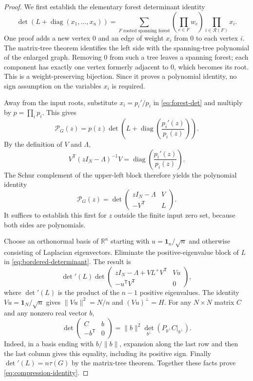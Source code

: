 \begin{proof}
We first establish the elementary forest determinant identity
\begin{equation}\label{eq:forest-det}
 \det(L+\operatorname{diag}(x_1,\ldots,x_n))
 =\sum_{F\text{ rooted spanning forest}}
   \left(\prod_{e\in F}w_e\right)\prod_{i\in\mathcal R(F)}x_i.
\end{equation}
One proof adds a new vertex $0$ and an edge of weight $x_i$ from $0$ to
each vertex $i$.  The matrix-tree theorem identifies the left side with
the spanning-tree polynomial of the enlarged graph.  Removing $0$ from
such a tree leaves a spanning forest; each component has exactly one
vertex formerly adjacent to $0$, which becomes its root.  This is a
weight-preserving bijection.  Since it proves a polynomial identity, no
sign assumption on the variables $x_i$ is required.

Away from the input roots, substitute $x_i=p_i'/p_i$ in
\eqref{eq:forest-det} and multiply by $p=\prod_i p_i$.  This gives
\begin{equation}\label{eq:meromorphic-determinant}
 \mathcal P_G(z)=p(z)
 \det\left(L+\operatorname{diag}\left(\frac{p_i'(z)}{p_i(z)}\right)\right).
\end{equation}
By the definition of $V$ and $\Lambda$,
\[
 V^{\mathsf T}(zI_N-\Lambda)^{-1}V
  =\operatorname{diag}\left(\frac{p_i'(z)}{p_i(z)}\right).
\]
The Schur complement of the upper-left block therefore yields the
polynomial identity
\begin{equation}\label{eq:bordered-determinant}
 \mathcal P_G(z)=
 \det\begin{pmatrix}zI_N-\Lambda&V\\-V^{\mathsf T}&L\end{pmatrix}.
\end{equation}
It suffices to establish this first for $z$ outside the finite input
zero set, because both sides are polynomials.

Choose an orthonormal basis of $\mathbb R^n$ starting with
$u=\boldsymbol1_n/\sqrt n$ and otherwise consisting of Laplacian
eigenvectors.  Eliminate the positive-eigenvalue block of $L$ in
\eqref{eq:bordered-determinant}.  The result is
\[
 \det{}'(L)
 \det\begin{pmatrix}
 zI_N-\Lambda+VL^+V^{\mathsf T}&Vu\\
 -u^{\mathsf T}V^{\mathsf T}&0
 \end{pmatrix},
\]
where $\det{}'(L)$ is the product of the $n-1$ positive eigenvalues.
The identity $Vu=\boldsymbol1_N/\sqrt n$ gives
$\|Vu\|^2=N/n$ and $(Vu)^\perp=H$.
For any $N\times N$ matrix $C$ and any nonzero real vector $b$,
\[
 \det\begin{pmatrix}C&b\\-b^{\mathsf T}&0\end{pmatrix}
   =\|b\|^2\det_{b^\perp}(P_{b^\perp}C|_{b^\perp}).
\]
Indeed, in a basis ending with $b/\|b\|$, expansion along the last row
and then the last column gives this equality, including its positive
sign.  Finally $\det{}'(L)=n\tau(G)$ by the matrix-tree theorem.
Together these facts prove \eqref{eq:compression-identity}.


\end{proof}
